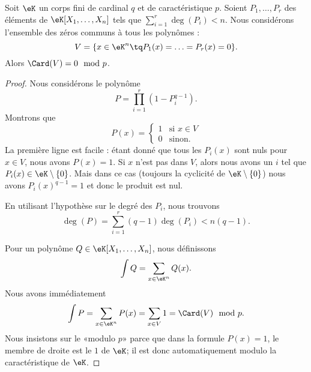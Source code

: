 \begin{theorem}           \label{ThoLTcYKk}
	Soit \( \eK\) un corps fini de cardinal \( q\) et de caractéristique \( p\). Soient \( P_1,\ldots, P_r\) des éléments de \( \eK[X_1,\ldots, X_n]\) tels que \( \sum_{i=1}^r\deg(P_i)<n\). Nous considérons l'ensemble des zéros communs à tous les polynômes :
	\begin{equation}
		V=\{ x\in \eK^n\tq P_1(x)=\ldots=P_r(x)=0 \}.
	\end{equation}
	Alors \( \Card(V)=0\mod p\).
\end{theorem}

\begin{proof}
	Nous considérons le polynôme
	\begin{equation}
		P=\prod_{i=1}^r(1-P_i^{q-1}).
	\end{equation}
	Montrons que
	\begin{equation}
		P(x)=\begin{cases}
			1 & \text{si } x\in V \\
			0 & \text{sinon}.
		\end{cases}
	\end{equation}
	La première ligne est facile : étant donné que tous les \( P_i(x)\) sont nuls pour \( x\in V\), nous avons \( P(x)=1\). Si \( x\) n'est pas dans \( V\), alors nous avons un \( i\) tel que \( P_i(x)\in \eK\setminus\{ 0 \}\). Mais dans ce cas (toujours la cyclicité de \( \eK\setminus\{ 0 \}\)) nous avons \( P_i(x)^{q-1}=1\) et donc le produit est nul.

	En utilisant l'hypothèse sur le degré des \( P_i\), nous trouvons
	\begin{equation}
		\deg(P)=\sum_{i=1}^r(q-1)\deg(P_i)<n(q-1).
	\end{equation}

	Pour un polynôme \( Q\in \eK[X_1,\ldots, X_n]\), nous définissons
	\begin{equation}
		\int Q=\sum_{x\in \eK^n}Q(x).
	\end{equation}
	Nous avons immédiatement
	\begin{equation}
		\int P=\sum_{x\in \eK^n}P(x)=\sum_{x\in V}1=\Card(V)\mod p.
	\end{equation}
	Nous insistons sur le «modulo \( p\)» parce que dans la formule \( P(x)=1\), le membre de droite est le \( 1\) de \( \eK\); il est donc automatiquement modulo la caractéristique de \( \eK\).


\end{proof}
